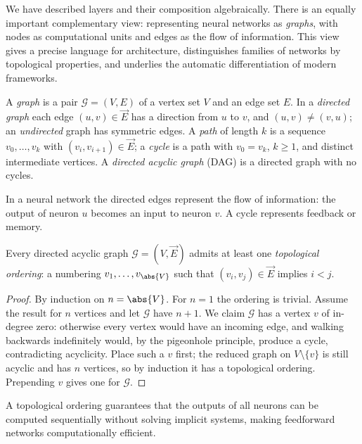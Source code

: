 We have described layers and their composition algebraically. There is an equally
important complementary view: representing neural networks as \emph{graphs}, with
nodes as computational units and edges as the flow of information. This view
gives a precise language for architecture, distinguishes families of networks by
topological properties, and underlies the automatic differentiation of modern
frameworks.

\begin{definition}
\label{def:found:graph}
A \emph{graph} is a pair $\mathcal{G} = (V, E)$ of a vertex set $V$ and an edge
set $E$. In a \emph{directed graph} each edge $(u,v) \in \vec{E}$ has a direction
from $u$ to $v$, and $(u,v) \ne (v,u)$; an \emph{undirected} graph has symmetric
edges. A \emph{path} of length $k$ is a sequence $v_0, \ldots, v_k$ with
$(v_i, v_{i+1}) \in \vec{E}$; a \emph{cycle} is a path with $v_0 = v_k$,
$k \ge 1$, and distinct intermediate vertices. A \emph{directed acyclic graph}
(DAG) is a directed graph with no cycles.
\end{definition}

In a neural network the directed edges represent the flow of information: the
output of neuron $u$ becomes an input to neuron $v$. A cycle represents feedback
or memory.

\begin{theorem}
\label{thm:found:topological}
Every directed acyclic graph $\mathcal{G} = (V, \vec{E})$ admits at least one
\emph{topological ordering}: a numbering $v_1, \ldots, v_{\abs{V}}$ such that
$(v_i, v_j) \in \vec{E}$ implies $i < j$.
\end{theorem}

\begin{proof}
By induction on $n = \abs{V}$. For $n = 1$ the ordering is trivial. Assume the
result for $n$ vertices and let $\mathcal{G}$ have $n+1$. We claim $\mathcal{G}$
has a vertex $v$ of in-degree zero: otherwise every vertex would have an incoming
edge, and walking backwards indefinitely would, by the pigeonhole principle,
produce a cycle, contradicting acyclicity. Place such a $v$ first; the reduced
graph on $V \setminus \{v\}$ is still acyclic and has $n$ vertices, so by
induction it has a topological ordering. Prepending $v$ gives one for
$\mathcal{G}$.
\end{proof}

A topological ordering guarantees that the outputs of all neurons can be computed
sequentially without solving implicit systems, making feedforward networks
computationally efficient.

